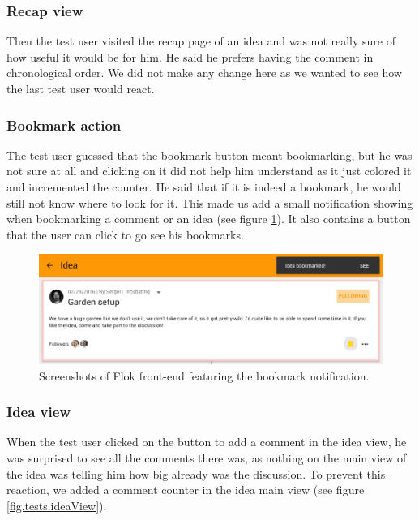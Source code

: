 \documentclass[a4paper,12pt,twoside]{article}
\begin{document}
\subsubsection*{Recap view}
Then the test user visited the recap page of an idea and was not really sure of how useful it would be for him.
He said he prefers having the comment in chronological order.
We did not make any change here as we wanted to see how the last test user would react.

\subsubsection*{Bookmark action}
The test user guessed that the bookmark button meant bookmarking, but he was not sure at all and clicking on it did not help him understand as it just colored it and incremented the counter.
He said that if it is indeed a bookmark, he would still not know where to look for it.
This made us add a small notification showing when bookmarking a comment or an idea (see figure \ref{fig.tests.bookmarkNotification}).
It also contains a button that the user can click to go see his bookmarks.

\begin{figure}[!htb]
    \centering
    \includegraphics[width=\textwidth]{images/user_tests/bookmarkNotification.png}
    \caption{Screenshots of Flok front-end featuring the bookmark notification.}
    \label{fig.tests.bookmarkNotification}
\end{figure}

\subsubsection*{Idea view}
When the test user clicked on the button to add a comment in the idea view, he was surprised to see all the comments there was, as nothing on the main view of the idea was telling him how big already was the discussion.
To prevent this reaction, we added a comment counter in the idea main view (see figure \ref{fig.tests.ideaView}).
\end{document}

